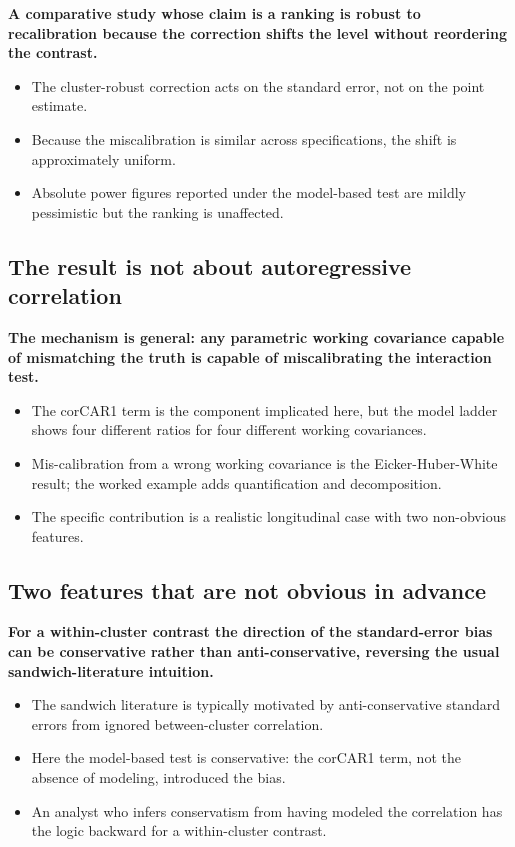 \documentclass[
  11pt,
]{article}
\begin{document}
\textbf{A comparative study whose claim is a ranking is robust to recalibration because the correction shifts the level without reordering the contrast.}

\begin{itemize}\setlength{\itemsep}{2pt}\setlength{\parskip}{0pt}
\item The cluster-robust correction acts on the standard error, not on the point estimate.
\item Because the miscalibration is similar across specifications, the shift is approximately uniform.
\item Absolute power figures reported under the model-based test are mildly pessimistic but the ranking is unaffected.
\end{itemize}

\subsection{The result is not about autoregressive correlation}\label{the-result-is-not-about-autoregressive-correlation}

\textbf{The mechanism is general: any parametric working covariance capable of mismatching the truth is capable of miscalibrating the interaction test.}

\begin{itemize}\setlength{\itemsep}{2pt}\setlength{\parskip}{0pt}
\item The corCAR1 term is the component implicated here, but the model ladder shows four different ratios for four different working covariances.
\item Mis-calibration from a wrong working covariance is the Eicker-Huber-White result; the worked example adds quantification and decomposition.
\item The specific contribution is a realistic longitudinal case with two non-obvious features.
\end{itemize}

\subsection{Two features that are not obvious in advance}\label{two-features-that-are-not-obvious-in-advance}

\textbf{For a within-cluster contrast the direction of the standard-error bias can be conservative rather than anti-conservative, reversing the usual sandwich-literature intuition.}

\begin{itemize}\setlength{\itemsep}{2pt}\setlength{\parskip}{0pt}
\item The sandwich literature is typically motivated by anti-conservative standard errors from ignored between-cluster correlation.
\item Here the model-based test is conservative: the corCAR1 term, not the absence of modeling, introduced the bias.
\item An analyst who infers conservatism from having modeled the correlation has the logic backward for a within-cluster contrast.
\end{itemize}
\end{document}
